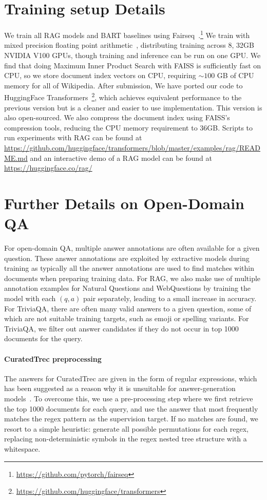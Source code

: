 \section{Training setup Details}
We train all RAG models and BART baselines using Fairseq~\cite{ott-etal-2019-fairseq}.\footnote{\url{https://github.com/pytorch/fairseq}}
We train with mixed precision floating point arithmetic~\cite{micikevicius2018mixed}, distributing training across 8, 32GB NVIDIA V100 GPUs, though training and inference can be run on one GPU.
We find that doing Maximum Inner Product Search with FAISS is sufficiently fast on CPU, so we store document index vectors on CPU, requiring $\sim100$ GB of CPU memory for all of Wikipedia.
After submission, We have ported our code to HuggingFace Transformers~\cite{Wolf2019HuggingFacesTS}\footnote{\url{https://github.com/huggingface/transformers}}, which achieves equivalent performance to the previous version but is a cleaner and easier to use implementation. This version is also open-sourced. We also compress the document index using FAISS's compression tools, reducing the CPU memory requirement to 36GB. Scripts to run experiments with RAG can be found at \url{https://github.com/huggingface/transformers/blob/master/examples/rag/README.md} and an interactive demo of a RAG model can be found at \url{https://huggingface.co/rag/}

\section{Further Details on Open-Domain QA}
\label{sec:qa_appendix}
For open-domain QA, multiple answer annotations are often available for a given question. These answer annotations are exploited by extractive models during training as typically all the answer annotations are used to find matches within documents when preparing training data. For RAG, we also make use of multiple annotation examples for Natural Questions and WebQuestions by training the model with each $(q,a)$ pair separately, leading to a small increase in accuracy. For TriviaQA, there are often many valid answers to a given question, some of which are not suitable training targets, such as emoji or spelling variants. For TriviaQA, we filter out answer candidates if they do not occur in top 1000 documents for the query.

\paragraph{CuratedTrec preprocessing}
The answers for CuratedTrec are given in the form of regular expressions, which has been suggested as a reason why it is unsuitable for answer-generation models~\cite{guu2020realm}. To overcome this, we use a pre-processing step where we first retrieve the top 1000 documents for each query, and use the answer that most frequently matches the regex pattern as the supervision target. If no matches are found, we resort to a simple heuristic: generate all possible permutations for each regex, replacing non-deterministic symbols in the regex nested tree structure with a whitespace.


